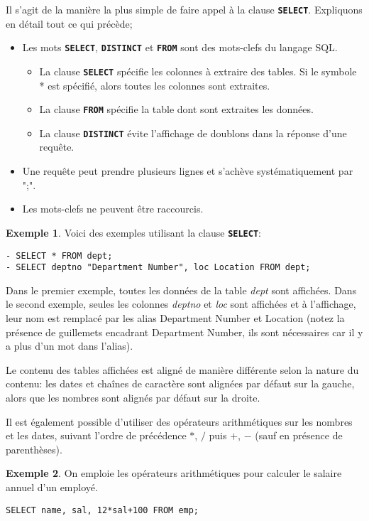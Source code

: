 \documentclass[a4paper, 12pt]{report}
\newcommand{\textSQL}[1]{\texttt{\textbf{#1}}}
\theoremstyle{definition} \newtheorem{ex}{Exemple}
\begin{document}
Il s'agit de la manière la plus simple de faire appel à la clause \textSQL{SELECT}. Expliquons en détail tout ce qui précède;
\begin{itemize}
\item Les mots \textSQL{SELECT}, \textSQL{DISTINCT} et \textSQL{FROM} sont des mots-clefs du langage SQL. 
	\begin{itemize}
		\item La clause \textSQL{SELECT} spécifie les colonnes à extraire des tables. Si le symbole * est spécifié, alors toutes les colonnes sont extraites.
		\item La clause \textSQL{FROM} spécifie la table dont sont extraites les données.
		\item La clause \textSQL{DISTINCT} évite l'affichage de doublons dans la réponse d'une requête.
	\end{itemize}
\item Une requête peut prendre plusieurs lignes et s'achève systématiquement par ";".
\item Les mots-clefs ne peuvent être raccourcis.
\end{itemize}
\begin{ex}
Voici des exemples utilisant la clause \textSQL{SELECT}:

\begin{lstlisting}[frame=single]
- SELECT * FROM dept;
- SELECT deptno "Department Number", loc Location FROM dept; 
\end{lstlisting}
Dans le premier exemple, toutes les données de la table \emph{dept} sont affichées. Dans le second exemple, seules les colonnes \emph{deptno} et \emph{loc} sont affichées et  à l'affichage, leur nom est remplacé par les alias Department Number et Location (notez la présence de guillemets encadrant Department Number, ils sont nécessaires car il y a plus d'un mot dans l'alias).
\end{ex}

 Le contenu des tables affichées est aligné de manière différente selon la nature du contenu: les dates et chaînes de caractère sont alignées par défaut sur la gauche, alors que les nombres sont alignés par défaut sur la droite.

Il est également possible d'utiliser des opérateurs arithmétiques sur les nombres et les dates, suivant l'ordre de précédence $*$, $/$ puis $+$, $-$ (sauf en présence de parenthèses).
\begin{ex}
On emploie les opérateurs arithmétiques pour calculer le salaire annuel d'un employé.
\begin{lstlisting}[frame=single]
SELECT name, sal, 12*sal+100 FROM emp;
\end{lstlisting}
\end{ex}
\end{document}
